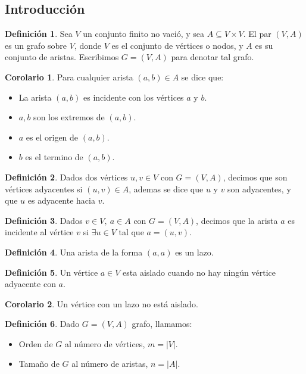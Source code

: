 \documentclass[10pt]{article}
\theoremstyle{definition}
\newtheorem{definition}{Definición}[section]
\newtheorem{corollary}{Corolario}[theorem]
\begin{document}
    \subsection{Introducción}
    \begin{definition}
        Sea $V$ un conjunto finito no vació, y sea $A\subseteq V\times V$. El par $(V,A)$ es un grafo sobre $V$, donde $V$ es el conjunto de vértices o nodos, y $A$ es su conjunto de aristas. Escribimos $G=(V,A)$ para denotar tal grafo.
    \end{definition}
    \begin{corollary}
        Para cualquier arista $(a,b)\in A$ se dice que:
        \begin{itemize}
            \item La arista $(a,b)$ es incidente con los vértices $a$ y $b$.
            \item $a,b$ son los extremos de $(a,b)$.
            \item $a$ es el origen de $(a,b)$.
            \item $b$ es el termino de $(a,b)$.
        \end{itemize}
    \end{corollary}
    \begin{definition}
        Dados dos vértices $u,v\in V$ con $G=(V,A)$, decimos que son vértices adyacentes si $(u,v)\in A$, ademas se dice que $u$ y $v$ son adyacentes, y que $u$ es adyacente hacia $v$.
    \end{definition}
    \begin{definition}
        Dados $v\in V,\ a\in A$ con $G=(V,A)$, decimos que la arista $a$ es incidente al vértice $v$ si $\exists u\in V$ tal que $a=(u,v)$.
    \end{definition}
    \begin{definition}
        Una arista de la forma $(a,a)$ es un lazo.
    \end{definition}
    \begin{definition}
        Un vértice $a\in V$ esta aislado cuando no hay ningún vértice adyacente con $a$.
    \end{definition}
    \begin{corollary}
        Un vértice con un lazo no está aislado.
    \end{corollary}
    \begin{definition}
        Dado $G=(V,A)$ grafo, llamamos:
        \begin{itemize}
            \item Orden de $G$ al número de vértices, $m=|V|$.
            \item Tamaño de $G$ al número de aristas, $n=|A|$.
        \end{itemize}
    \end{definition}
\end{document}
